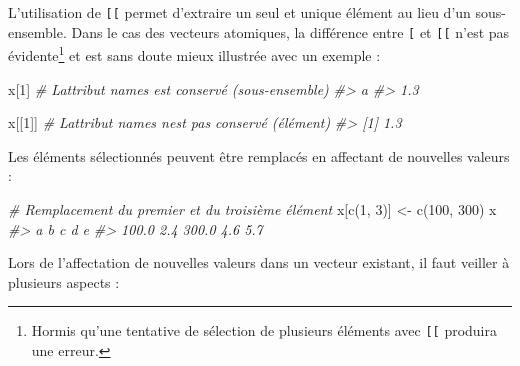 \documentclass[
  french,
]{scrbook}
\newenvironment{Shaded}{\begin{snugshade}}{\end{snugshade}}
\newcommand{\CommentTok}[1]{\textcolor[rgb]{0.56,0.35,0.01}{\textit{#1}}}
\newcommand{\DecValTok}[1]{\textcolor[rgb]{0.00,0.00,0.81}{#1}}
\newcommand{\FunctionTok}[1]{\textcolor[rgb]{0.00,0.00,0.00}{#1}}
\newcommand{\NormalTok}[1]{#1}
\newcommand{\OtherTok}[1]{\textcolor[rgb]{0.56,0.35,0.01}{#1}}
\begin{document}
L'utilisation de \texttt{{[}{[}} permet d'extraire un seul et unique élément au lieu d'un sous-ensemble. Dans le cas des vecteurs atomiques, la différence entre \texttt{{[}} et \texttt{{[}{[}} n'est pas évidente\footnote{Hormis qu'une tentative de sélection de plusieurs éléments avec \texttt{{[}{[}} produira une erreur.} et est sans doute mieux illustrée avec un exemple :

\begin{Shaded}
\begin{Highlighting}[]
\NormalTok{x[}\DecValTok{1}\NormalTok{] }\CommentTok{\# L\textquotesingle{}attribut names est conservé (sous{-}ensemble)}
\CommentTok{\#\textgreater{}   a }
\CommentTok{\#\textgreater{} 1.3}

\NormalTok{x[[}\DecValTok{1}\NormalTok{]] }\CommentTok{\# L\textquotesingle{}attribut names n\textquotesingle{}est pas conservé (élément)}
\CommentTok{\#\textgreater{} [1] 1.3}
\end{Highlighting}
\end{Shaded}

Les éléments sélectionnés peuvent être remplacés en affectant de nouvelles valeurs :

\begin{Shaded}
\begin{Highlighting}[]
\CommentTok{\# Remplacement du premier et du troisième élément}
\NormalTok{x[}\FunctionTok{c}\NormalTok{(}\DecValTok{1}\NormalTok{, }\DecValTok{3}\NormalTok{)] }\OtherTok{\textless{}{-}} \FunctionTok{c}\NormalTok{(}\DecValTok{100}\NormalTok{, }\DecValTok{300}\NormalTok{)}
\NormalTok{x}
\CommentTok{\#\textgreater{}     a     b     c     d     e }
\CommentTok{\#\textgreater{} 100.0   2.4 300.0   4.6   5.7}
\end{Highlighting}
\end{Shaded}

Lors de l'affectation de nouvelles valeurs dans un vecteur existant, il faut veiller à plusieurs aspects :
\end{document}
